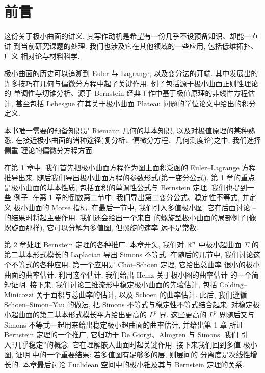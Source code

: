 \chapter*{前言}

这份关于极小曲面的讲义, 其写作动机是希望有一份几乎不设预备知识、却能一直讲
到当前研究课题的处理. 我们也涉及它在其他领域的一些应用, 包括低维拓扑、广义
相对论与材料科学.

极小曲面的历史可以追溯到 Euler 与 Lagrange, 以及变分法的开端. 其中发展出的
许多技巧在几何与偏微分方程中起了关键作用. 例子包括源于极小曲面正则性理论的
单调性与切锥分析、源于 Bernstein 经典工作中基于极值原理的非线性方程估计,
甚至包括 Lebesgue 在其关于极小曲面 Plateau 问题的学位论文中给出的积分定义.

本书唯一需要的预备知识是 Riemann 几何的基本知识, 以及对极值原理的某种熟悉.
在接近极小曲面的诸种途径(复分析、偏微分方程、几何测度论)之中, 我们选择侧重
理论的偏微分方程方面.

在第 1 章中, 我们首先把极小曲面方程作为图上面积泛函的 Euler--Lagrange 方程
推导出来. 随后我们导出极小曲面方程的参数形式(第一变分公式). 第 1 章的重点
是极小曲面的基本性质, 包括面积的单调性公式与 Bernstein 定理. 我们也提到一些
例子. 在第 1 章的倒数第二节中, 我们导出第二变分公式、稳定性不等式, 并定义
极小曲面的 Morse 指标. 在最后一节中, 我们引入多值极小图, 它在后面讨论
\cite{CM3}--\cite{CM7} 的结果时将起主要作用. 我们还会给出一个来自 \cite{CM18}
的螺旋型极小曲面的局部例子(像螺旋面那样), 它可以分解为多值图, 但螺旋的速率
远不是常数.

第 2 章处理 Bernstein 定理的各种推广. 本章开头, 我们对 $\mathbb{R}^n$ 中极小超曲面
$\Sigma$ 的第二基本形式模长的 Laplacian 导出 Simons 不等式. 在随后的几节中,
我们讨论这个不等式的各种应用. 第一个应用是 Choi--Schoen 定理, 它给出总曲率
很小的极小曲面的曲率估计. 利用这个估计, 我们给出 Heinz 关于极小图的曲率估计
的一个简短证明. 接下来, 我们讨论三维流形中稳定极小曲面的先验估计, 包括
Colding--Minicozzi 关于面积与总曲率的估计, 以及 Schoen 的曲率估计. 此后,
我们遵循 Schoen--Simon--Yau 的做法, 把 Simons 不等式与稳定性不等式结合起来,
对稳定极小超曲面的第二基本形式模长平方给出更高的 $L^p$ 界. 这些更高的 $L^p$
界随后又与 Simons 不等式一起用来给出稳定极小超曲面的曲率估计, 并给出第 1 章
所证 Bernstein 定理的一个推广, 它归功于 De Giorgi、Almgren 与 Simons. 我们
引入``几乎稳定''的概念, 它在理解嵌入曲面时起关键作用. 接下来我们回到多值
极小图, 证明 \cite{CM3} 中的一个重要结果: 若多值图有足够多的层, 则层间的
分离度是次线性增长的. 本章最后讨论 Euclidean 空间中的极小锥及其与 Bernstein
定理的关系.

